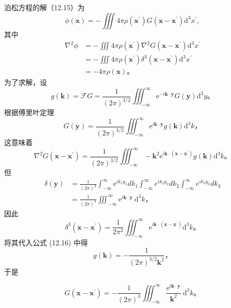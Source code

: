 泊松方程的解（12.15）为
 $$
\phi(\mathbf{x})=-\iiint 4 \pi \rho\left(\mathbf{x}^{\prime}\right) G\left(\mathbf{x}-\mathbf{x}^{\prime}\right) \mathrm{d}^{3} x^{\prime},
$$
其中
 $$
\begin{aligned}
\nabla^{2} \phi & =-\iiint 4 \pi \rho\left(\mathbf{x}^{\prime}\right) \nabla^{2} G\left(\mathbf{x}-\mathbf{x}^{\prime}\right) \mathrm{d}^{3} x^{\prime} \\
& =-\iiint 4 \pi \rho\left(\mathbf{x}^{\prime}\right) \delta^{3}\left(\mathbf{x}-\mathbf{x}^{\prime}\right) \mathrm{d}^{3} x^{\prime} \\
& =-4 \pi \rho(\mathbf{x})。
\end{aligned}
$$
为了求解，设
 $$
g(\mathbf{k})=\mathcal{F} G=\frac{1}{(2 \pi)^{3 / 2}} \iiint_{-\infty}^{\infty} \mathrm{e}^{-i \mathbf{k} \cdot \mathbf{y}} G(\mathbf{y}) \mathrm{d}^{3} y。
$$
根据傅里叶定理
 $$
G(\mathbf{y})=\frac{1}{(2 \pi)^{3 / 2}} \iiint_{-\infty}^{\infty} \mathrm{e}^{i \mathbf{k} \cdot \mathbf{y}} g(\mathbf{k}) \mathrm{d}^{3} k，
$$
这意味着
 $$
\nabla^{2} G\left(\mathbf{x}-\mathbf{x}^{\prime}\right)=\frac{1}{(2 \pi)^{3 / 2}} \iiint_{-\infty}^{\infty}-\mathbf{k}^{2} \mathrm{e}^{i \mathbf{k} \cdot \left(\mathbf{x}-\mathbf{x}^{\prime}\right)} g(\mathbf{k}) \mathrm{d}^{3} k。
$$
但
 $$
\begin{aligned}
\delta(\mathbf{y}) & =\frac{1}{(2 \pi)^{3}} \int_{-\infty}^{\infty} \mathrm{e}^{i k_{1} y_{1}} d k_{1} \int_{-\infty}^{\infty} e^{i k_{2} y_{2}} d k_{2} \int_{-\infty}^{\infty} e^{i k_{3} y_{3}} d k_{3} \\
& =\frac{1}{(2 \pi)^{3}} \iiint_{-\infty}^{\infty} \mathrm{e}^{i \mathbf{k} \cdot \mathbf{y}} \mathrm{~d}^{3} k，
\end{aligned}
$$
因此
 $$
\delta^{3}\left(\mathbf{x}-\mathbf{x}^{\prime}\right)=\frac{1}{2 \pi^{3}} \iiint_{-\infty}^{\infty} \mathrm{e}^{i \mathbf{k} \cdot\left(\mathbf{x}-\mathbf{x}^{\prime}\right)} \mathrm{d}^{3} k。
$$
将其代入公式 (12.16) 中得
 $$
g(\mathbf{k})=-\frac{1}{(2 \pi)^{3 / 2} \mathbf{k}^{2}}，
$$
于是

\begin{equation}\label{eq:12.17} 
 G\left(\mathbf{x}-\mathbf{x}^{\prime}\right)=-\frac{1}{(2 \pi)^{3}} \iiint_{-\infty}^{\infty} \frac{\mathrm{e}^{i \mathbf{k} \cdot \mathbf{y}}}{\mathbf{k}^{2}} \mathrm{~d}^{3} k。 
 \end{equation}


